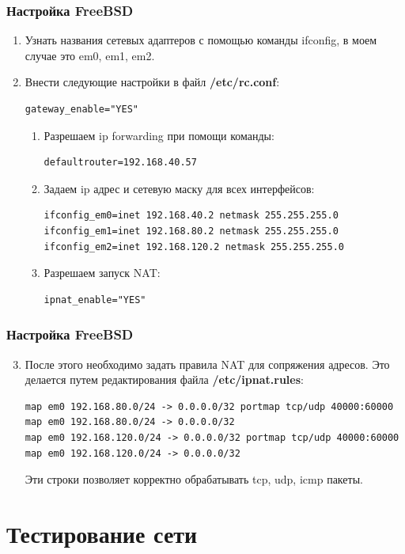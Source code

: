 \documentclass[9pt, compress]{beamer}
\begin{document}
\begin{frame}[fragile]
\frametitle{Настройка FreeBSD}
\begin{enumerate}
\item Узнать названия сетевых адаптеров с помощью команды ifconfig, в моем случае это em0, em1, em2.
\item Внести следующие настройки в файл \textbf{/etc/rc.conf}:
\begin{lstlisting}[language={}]
gateway_enable="YES"
\end{lstlisting}
\begin{enumerate}
\item Разрешаем ip forwarding при помощи команды:
\begin{lstlisting}[language={}]
defaultrouter=192.168.40.57
\end{lstlisting}
\item Задаем ip адрес и сетевую маску для всех интерфейсов:
\begin{lstlisting}[language={}]
ifconfig_em0=inet 192.168.40.2 netmask 255.255.255.0
ifconfig_em1=inet 192.168.80.2 netmask 255.255.255.0
ifconfig_em2=inet 192.168.120.2 netmask 255.255.255.0
\end{lstlisting}
\item Разрешаем запуск NAT:
\begin{lstlisting}[language={}]
ipnat_enable="YES"
\end{lstlisting}
\end{enumerate}
\end{enumerate}
\end{frame}

\begin{frame}[fragile]
\frametitle{Настройка FreeBSD}
\begin{enumerate}
\setcounter{enumi}{2}
\item После этого необходимо задать правила NAT для сопряжения адресов. Это делается путем редактирования файла \textbf{/etc/ipnat.rules}:
\begin{lstlisting}[language={}]
map em0 192.168.80.0/24 -> 0.0.0.0/32 portmap tcp/udp 40000:60000 
map em0 192.168.80.0/24 -> 0.0.0.0/32 
map em0 192.168.120.0/24 -> 0.0.0.0/32 portmap tcp/udp 40000:60000
map em0 192.168.120.0/24 -> 0.0.0.0/32
\end{lstlisting}
Эти строки позволяет корректно обрабатывать tcp, udp, icmp пакеты.
\end{enumerate}
\end{frame}

\section{Тестирование сети}
\end{document}
